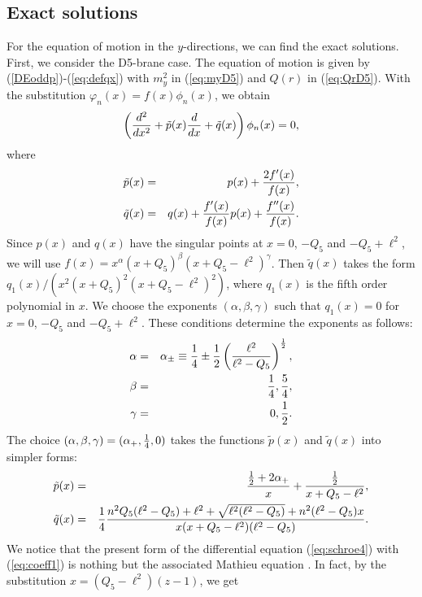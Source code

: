 \documentclass[a4paper,12pt]{article}
\begin{document}
\subsection{Exact solutions}
For the equation of motion in the $y$-directions,
we can find the exact solutions. 
First, we consider the D5-brane case.
The equation of motion is given by (\ref{DEoddp})-(\ref{eq:defqx})
with $m^{2}_{y}$ in (\ref{eq:myD5}) and $Q(r)$ in (\ref{eq:QrD5}).
With the substitution
$\varphi_{n}(x)=f(x)\phi_{n}(x)$,
we obtain
\begin{equation}
\left( {d^2\over dx^2}
+\tilde{p}(x){d\over dx}+\tilde{q}(x)
\right)\phi_{n}(x)=0,
\label{eq:schroe4}
\end{equation}
where
\begin{eqnarray}
\tilde{p}(x)&=&p(x)+{2f'(x)\over f(x)}, \nonumber \\
\tilde{q}(x)&=& q(x)+{f'(x)\over f(x)}p(x)+{f''(x)\over f(x)}.
\end{eqnarray}
Since $p(x)$ and $q(x)$ have the singular points at 
$x=0$, $-Q_{5}$ and $-Q_{5}+\ell^2$, we will use 
$f(x)=x^{\alpha}(x+Q_{5})^{\beta}(x+Q_{5}-\ell^2)^{\gamma}$.
Then $\tilde{q}(x)$ takes the form 
$q_{1}(x)/(x^2(x+Q_{5})^2(x+Q_{5}-\ell^2)^2)$, 
where $q_{1}(x)$ is the fifth
order polynomial in $x$.
We choose the exponents $(\alpha,\beta,\gamma)$ 
such that $q_{1}(x)=0$
for $x=0$, $-Q_{5}$ and $-Q_{5}+\ell^2$. 
These conditions determine the exponents as follows:
\begin{eqnarray}
\alpha&=&\alpha_{\pm}\equiv {1\over4}\pm {1\over2}
\left(\ell^2\over \ell^2-Q_{5}\right)^{1\over2},\nonumber\\
\beta&=&{1\over4}, {5\over4},\nonumber\\
\gamma&=&0,{1\over2}.
\end{eqnarray}
The choice $(\alpha,\beta,\gamma)=(\alpha_{+},{1\over4},0)$ takes
the functions
$\tilde{p}(x)$ and $\tilde{q}(x)$
 into simpler forms:
\begin{eqnarray}
 \tilde{p}(x)&=&{{1\over2}+2\alpha_{+}\over x}
+{{1\over2}\over x+Q_{5}-\ell^2},\nonumber\\
\tilde{q}(x)&=&
{1\over4}{n^2 Q_{5}(\ell^2-Q_{5})+\ell^2+\sqrt{\ell^2(\ell^2-Q_{5})}
+n^2(\ell^2-Q_{5})x\over x(x+Q_{5}-\ell^2)(\ell^2-Q_{5})}.
\label{eq:coeff1}
\end{eqnarray}
We notice that the present form of the differential equation 
(\ref{eq:schroe4}) with (\ref{eq:coeff1}) is nothing but the associated
Mathieu equation \cite{In}. 
In fact, by the substitution $x=(Q_{5}-\ell^2)(z-1)$, we get
\end{document}
